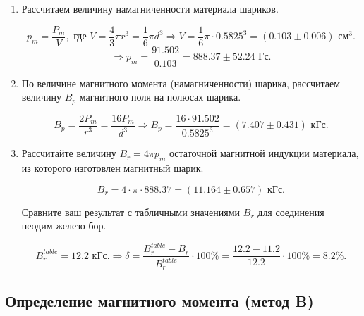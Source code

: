 \documentclass[a4paper,12pt]{article} %
\begin{document}
\begin{enumerate}
    \item Рассчитаем величину намагниченности материала шариков.

    \[ p_m = \frac{P_m}{V}, \text{ где } V = \frac{4}{3}\pi r^3 = \frac{1}{6}\pi d^3 \Longrightarrow V = \frac{1}{6}\pi \cdot 0.5825^3 = (0.103 \pm 0.006) \text{ см}^3. \]
    \[ \Longrightarrow p_m = \frac{91.502}{0.103} = 888.37 \pm 52.24 \text{ Гс.} \]

    \item По величине магнитного момента (намагниченности) шарика, рассчитаем величину $B_p$ магнитного поля на полюсах шарика.

    \[ B_p = \frac{2P_m}{r^3} = \frac{16P_m}{d^3} \Longrightarrow B_p = \frac{16\cdot91.502}{0.5825^3} = (7.407 \pm 0.431) \text{ кГс.} \]

    \item Рассчитайте величину $B_r = 4\pi p_m$ остаточной магнитной индукции материала, из которого изготовлен магнитный шарик.

    \[ B_r = 4\cdot\pi\cdot 888.37 = (11.164 \pm 0.657) \text{ кГс.} \]

    Сравните ваш результат с табличными значениями $B_r$ для соединения неодим-железо-бор.

    \[ B_r^{table} = 12.2 \text{ кГс.} \Longrightarrow \delta = \frac{B_r^{table} - B_r}{B_r^{table}} \cdot 100\% = \frac{12.2 - 11.2}{12.2} \cdot 100\% = 8.2\%. \]
    
\end{enumerate}

\subsection{Определение магнитного момента (метод B)}
\end{document}
